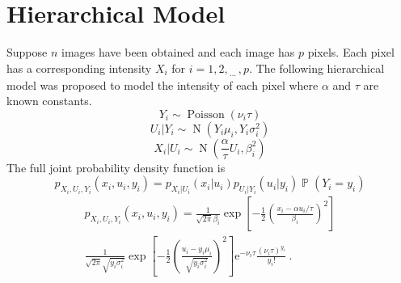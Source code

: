 \documentclass[12pt]{report}
\DeclareMathOperator{\prob}{\mathbb{P}}
\DeclareMathOperator{\normal}{N}
\DeclareMathOperator{\poisson}{Poisson}
\newcommand{\euler}{\mathrm{e}}
\newcommand{\dotdotdot}{_{\phantom{.}\cdots}}
\begin{document}
\section{Hierarchical Model}
Suppose $n$ images have been obtained and each image has $p$ pixels. Each pixel has a corresponding intensity $X_i$ for $i=1,2,\dotdotdot,p$. The following hierarchical model was proposed to model the intensity of each pixel where $\alpha$ and $\tau$ are known constants.
\begin{equation}
Y_i\sim\poisson(\nu_i \tau)
\end{equation}
\begin{equation}
U_i|Y_i\sim\normal\left(
Y_i\mu_i,Y_i\sigma_i^2
\right)
\end{equation}
\begin{equation}
X_i|U_i\sim\normal\left(
\frac{\alpha}{\tau}U_i,\beta_i^2
\right)
\end{equation}
The full joint probability density function is
\begin{equation}
p_{X_i,U_i,Y_i}\left(x_i,u_i,y_i\right)=
p_{X_i|U_i}(x_i|u_i)p_{U_i|Y_i}(u_i|y_i)\prob(Y_i=y_i)
\end{equation}
\begin{multline}
p_{X_i,U_i,Y_i}\left(x_i,u_i,y_i\right)=
\frac{1}{\sqrt{2\pi}\beta_i}\exp\left[-\frac{1}{2}\left(\frac{x_i-\alpha u_i /\tau}{\beta_i}\right)^2\right]
\\
\frac{1}{\sqrt{2\pi}\sqrt{y_i\sigma_i^2}}\exp\left[-\frac{1}{2}\left(\frac{u_i-y_i\mu_i}{\sqrt{y_i\sigma_i^2}}\right)^2\right]
\euler^{-\nu_i\tau}\frac{(\nu_i\tau)^{y_i}}{y_i!} \ .
\end{multline}
\end{document}
